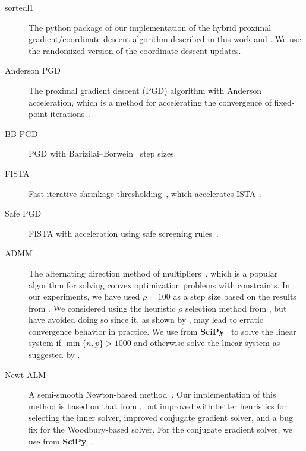 \documentclass[a4paper,fleqn]{cas-sc}
\begin{document}
\begin{description}
  \item[sortedl1] The python package of our implementation of the hybrid
        proximal gradient/coordinate descent algorithm described in this work
        and \citet{larsson2023}. We use the randomized version of the coordinate
        descent updates.

  \item[Anderson PGD] The proximal gradient descent (PGD) algorithm with
        Anderson acceleration, which is a method for accelerating the
        convergence of fixed-point iterations~\citep{anderson1965, zhang2020}.

  \item[BB PGD] PGD with Barizilai--Borwein~\citep{barzilai1988} step sizes.

  \item[FISTA] Fast iterative shrinkage-thresholding~\citep{beck2009}, which
        accelerates ISTA~\citep{wright2009}.

  \item[Safe PGD] FISTA with acceleration using safe screening
        rules~\citep{elvira2023}.

  \item[ADMM] The alternating direction method of
        multipliers~\citep{glowinski1975, boyd2010}, which is a popular
        algorithm for solving convex optimization problems with constraints. In
        our experiments, we have used \(\rho = 100\) as a step size based on the
        results from \citet{larsson2023}. We considered using the heuristic
        \(\rho\) selection method from \citet{boyd2010}, but have avoided doing
        so since it, as shown by \citet{larsson2023}, may lead to erratic
        convergence behavior in practice. We use  from
        \textbf{SciPy}~\citep{virtanen2020} to solve the linear system if
        \(\min\{n, p\} > \num{1000}\) and otherwise solve the linear system as
        suggested by \citet{boyd2010}.

  \item[Newt-ALM] A semi-smooth Newton-based method~\citep{luo2019}. Our
        implementation of this method is based on that from \citet{larsson2023},
        but improved with better heuristics for selecting the inner solver,
        improved conjugate gradient solver, and a bug fix for the Woodbury-based
        solver. For the conjugate gradient solver, we use  from
        \textbf{SciPy}~\citep{virtanen2020}.


\end{description}
\end{document}

